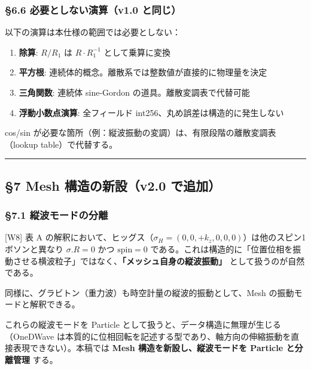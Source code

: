 \documentclass[a4paper,11pt]{ltjsarticle}
\providecommand{\tightlist}{\setlength{\itemsep}{0pt}\setlength{\parskip}{0pt}}
\begin{document}
\subsubsection{§6.6 必要としない演算（v1.0
と同じ）}\label{ux5fc5ux8981ux3068ux3057ux306aux3044ux6f14ux7b97v1.0-ux3068ux540cux3058}

以下の演算は本仕様の範囲では必要としない：

\begin{enumerate}
\def\labelenumi{\arabic{enumi}.}
\tightlist
\item
  \textbf{除算}: \(R/R_1\) は \(R \cdot R_1^{-1}\) として乗算に変換
\item
  \textbf{平方根}: 連続体的概念。離散系では整数値が直接的に物理量を決定
\item
  \textbf{三角関数}: 連続体 sine-Gordon の道具。離散変調表で代替可能
\item
  \textbf{浮動小数点演算}: 全フィールド
  int256、丸め誤差は構造的に発生しない
\end{enumerate}

cos/sin
が必要な箇所（例：縦波振動の変調）は、有限段階の離散変調表（lookup
table）で代替する。

\begin{center}\rule{0.5\linewidth}{0.5pt}\end{center}

\subsection{§7 Mesh 構造の新設（v2.0
で追加）}\label{mesh-ux69cbux9020ux306eux65b0ux8a2dv2.0-ux3067ux8ffdux52a0}

\subsubsection{§7.1
縦波モードの分離}\label{ux7e26ux6ce2ux30e2ux30fcux30c9ux306eux5206ux96e2}

{[}W8{]} 表 A
の解釈において、ヒッグス（\(\sigma_H = (0, 0, +k_z, 0, 0, 0)\)）は他のスピン1ボソンと異なり
\(\sigma.R = 0\) かつ \(\text{spin} = 0\)
である。これは構造的に「位置位相を振動させる横波粒子」ではなく、\textbf{「メッシュ自身の縦波振動」}
として扱うのが自然である。

同様に、グラビトン（重力波）も時空計量の縦波的振動として、Mesh
の振動モードと解釈できる。

これらの縦波モードを Particle
として扱うと、データ構造に無理が生じる（OneDWave
は本質的に位相回転を記述する型であり、軸方向の伸縮振動を直接表現できない）。本稿では
\textbf{Mesh 構造を新設し、縦波モードを Particle と分離管理} する。
\end{document}

